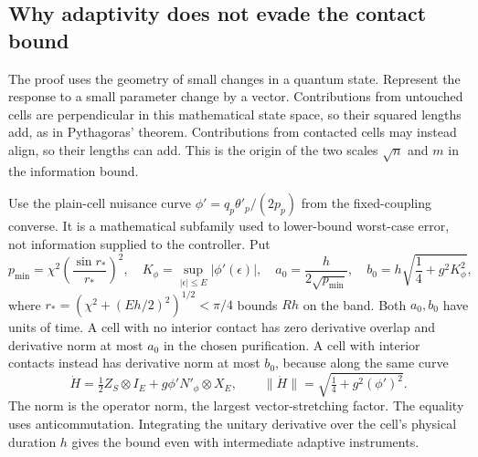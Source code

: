 \documentclass[11pt,a4paper]{article}
\numberwithin{equation}{section}
\theoremstyle{remark}
\begin{document}
\subsection{Why adaptivity does not evade the contact bound}

The proof uses the geometry of small changes in a quantum state. Represent
the response to a small parameter change by a vector. Contributions from
untouched cells are perpendicular in this mathematical state space, so their
squared lengths add, as in Pythagoras' theorem. Contributions from contacted
cells may instead align, so their lengths can add. This is the origin of the
two scales $\sqrt n$ and $m$ in the information bound.

Use the plain-cell nuisance curve
$\phi'=q_p\theta'_p/(2p_p)$ from the fixed-coupling converse. It is a
mathematical subfamily used to lower-bound worst-case error, not information
supplied to the controller. Put
\begin{equation}
 p_{\min}=\chi^2\left(\frac{\sin r_*}{r_*}\right)^2,\quad
 K_\phi=\sup_{|\epsilon|\le E}|\phi'(\epsilon)|,\quad
 a_0=\frac{h}{2\sqrt{p_{\min}}},\quad
 b_0=h\sqrt{\frac14+g^2K_\phi^2},
\end{equation}
where $r_*=(\chi^2+(Eh/2)^2)^{1/2}<\pi/4$ bounds $Rh$ on the band.
Both $a_0,b_0$ have units of time. A cell with no interior contact has
zero derivative overlap and derivative norm at most $a_0$ in the chosen
purification. A cell with interior contacts instead has derivative norm
at most $b_0$, because along the same curve
\begin{equation}
 \dot H=\tfrac12Z_S\otimes I_E
       +g\phi' N'_\phi\otimes X_E,
 \qquad \|\dot H\|=\sqrt{\tfrac14+g^2(\phi')^2}.
\end{equation}
The norm is the operator norm, the largest vector-stretching factor. The equality
uses anticommutation. Integrating the unitary derivative over the cell's
physical duration $h$ gives the bound even with intermediate adaptive
instruments.
\end{document}

